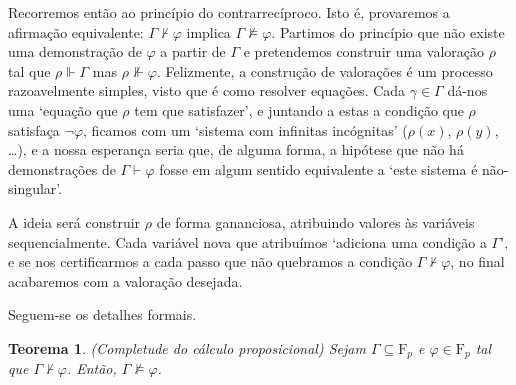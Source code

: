 \documentclass{report}
\newtheorem{teorema}{Teorema}
\theoremstyle{definition}
\theoremstyle{remark}
\newcommand{\F}{\mathrm{F}}
\begin{document}
	Recorremos então ao princípio do contrarrecíproco. Isto é, provaremos a afirmação equivalente: $\Gamma \nvdash \varphi$ implica $\Gamma \nvDash \varphi$. Partimos do princípio que não existe uma demonstração de $\varphi$ a partir de $\Gamma$ e pretendemos construir uma valoração $\rho$ tal que $\rho \Vdash \Gamma$ mas $\rho \nVdash \varphi$. Felizmente, a construção de valorações é um processo razoavelmente simples, visto que é como resolver equações. Cada $\gamma \in \Gamma$ dá-nos uma `equação que $\rho$ tem que satisfazer', e juntando a estas a condição que $\rho$ satisfaça $\neg \varphi$, ficamos com um `sistema com infinitas incógnitas' ($\rho(x)$, $\rho(y)$, \dots), e a nossa esperança seria que, de alguma forma, a hipótese que não há demonstrações de $\Gamma \vdash \varphi$ fosse em algum sentido equivalente a `este sistema é não-singular'.
	
	A ideia será construir $\rho$ de forma gananciosa, atribuindo valores às variáveis sequencialmente. Cada variável nova que atribuímos `adiciona uma condição a $\Gamma$', e se nos certificarmos a cada passo que não quebramos a condição $\Gamma \nvdash \varphi$, no final acabaremos com a valoração desejada.
	
	Seguem-se os detalhes formais.
	
	\begin{teorema} (Completude do cálculo proposicional)
	Sejam $\Gamma \subseteq \F_p$ e $\varphi \in \F_p$ tal que $\Gamma \nvdash \varphi$. Então, $\Gamma \nvDash \varphi$.
	\end{teorema}
	
\end{document}
